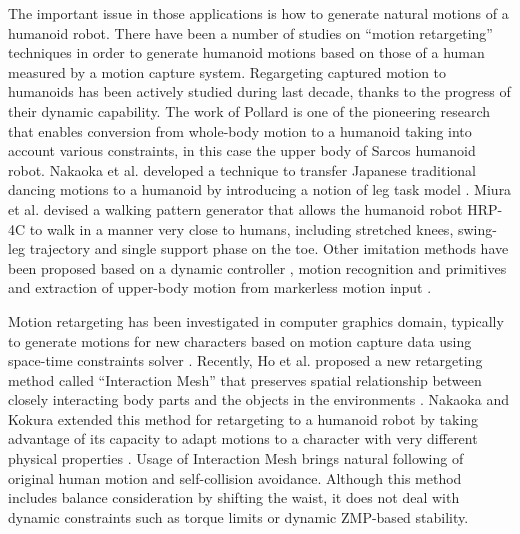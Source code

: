 \documentclass[letterpaper, 10 pt, conference]{ieeeconf}  %
\begin{document}
The important issue in those applications is how to generate natural
motions of a humanoid robot. 
There have been a number of studies on ``motion retargeting''
techniques in order to
generate humanoid motions based on those of a human measured by a
motion capture system.
Regargeting captured motion to humanoids has been
actively studied during last decade, thanks to the progress of their
dynamic capability. The work of Pollard \cite{Pollard02ICRA} is one of
the pioneering research that enables conversion from whole-body motion
to a humanoid taking into account various constraints, in this case
the upper body of Sarcos humanoid robot.
Nakaoka et al. developed a technique to  transfer
Japanese traditional dancing motions  to a humanoid by introducing a
notion of leg task model \cite{nakaoka_icra2004,nakaoka_2007}.
Miura et al. \cite{Miura11IROS} devised a walking pattern generator
that allows the humanoid robot HRP-4C to walk in a manner very close
to humans, including stretched knees, swing-leg trajectory and single
support phase on the toe.
Other imitation methods have been proposed based on a dynamic
controller  \cite{Yamane11humanoids,Ramos11humanoids}, 
motion recognition and primitives \cite{Ott08humanoids} and
extraction of upper-body motion from markerless motion input
\cite{Dariush08IROS,Do08humanoids}. 



% 


Motion retargeting has been investigated in computer
graphics domain, typically to generate motions for new characters
based on motion capture data using space-time constraints solver
\cite{Gleicher98}.  
Recently, Ho et al. proposed a new retargeting method called
``Interaction Mesh'' 
that preserves spatial relationship between closely interacting body
parts and the objects in the environments \cite{Komura10}.
Nakaoka and Kokura extended this method for retargeting to a humanoid
robot by taking advantage of its capacity to adapt motions
to a character with very different physical properties
\cite{Nakaoka12Humanoids}. Usage of Interaction Mesh brings natural
following of original human motion and self-collision avoidance.
Although this method includes
balance consideration by shifting the waist,  it does not deal with 
dynamic constraints such as torque limits or dynamic ZMP-based stability.
\end{document}
